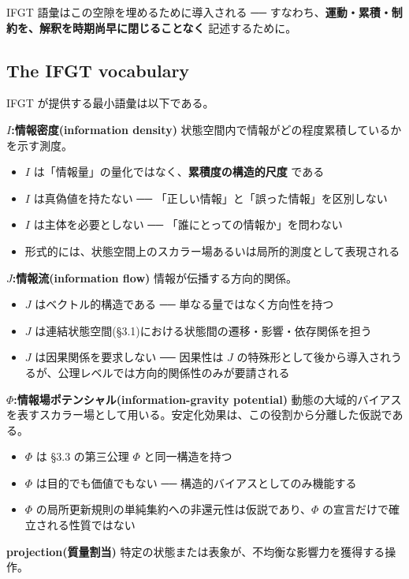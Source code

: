 IFGT 語彙はこの空隙を埋めるために導入される ── すなわち、\textbf{運動・累積・制約を、解釈を時期尚早に閉じることなく} 記述するために。

\subsection{The IFGT vocabulary}


IFGT が提供する最小語彙は以下である。

\textbf{$I$:情報密度(information density)}
状態空間内で情報がどの程度累積しているかを示す測度。

\begin{itemize}
\item $I$ は「情報量」の量化ではなく、\textbf{累積度の構造的尺度} である
\item $I$ は真偽値を持たない ── 「正しい情報」と「誤った情報」を区別しない
\item $I$ は主体を必要としない ── 「誰にとっての情報か」を問わない
\item 形式的には、状態空間上のスカラー場あるいは局所的測度として表現される
\end{itemize}

\textbf{$J$:情報流(information flow)}
情報が伝播する方向的関係。

\begin{itemize}
\item $J$ はベクトル的構造である ── 単なる量ではなく方向性を持つ
\item $J$ は連結状態空間(\S{}3.1)における状態間の遷移・影響・依存関係を担う
\item $J$ は因果関係を要求しない ── 因果性は $J$ の特殊形として後から導入されうるが、公理レベルでは方向的関係性のみが要請される
\end{itemize}

\textbf{$\Phi$:情報場ポテンシャル(information-gravity potential)}
動態の大域的バイアスを表すスカラー場として用いる。安定化効果は、この役割から分離した仮説である。

\begin{itemize}
\item $\Phi$ は \S{}3.3 の第三公理 $\Phi$ と同一構造を持つ
\item $\Phi$ は目的でも価値でもない ── 構造的バイアスとしてのみ機能する
\item $\Phi$ の局所更新規則の単純集約への非還元性は仮説であり、$\Phi$ の宣言だけで確立される性質ではない
\end{itemize}

\textbf{projection(質量割当)}
特定の状態または表象が、不均衡な影響力を獲得する操作。

